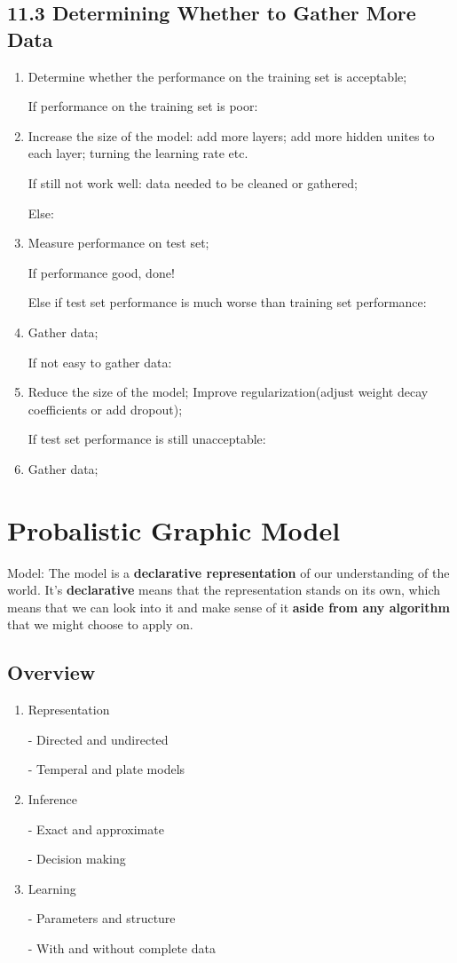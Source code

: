 \documentclass[12pt]{article}
\numberwithin{equation}{section}
\begin{document}
\subsection{11.3 Determining Whether to Gather More Data}
\begin{enumerate}
	\item Determine whether the performance on the training set is acceptable; 
	
	If performance on the training set is poor:
	\item Increase the size of the model: add more layers; add more hidden unites to each layer; turning 
	the learning rate etc.
	
	If still not work well: data needed to be cleaned or gathered;
	
	Else:
	\item Measure performance on test set;
	
	If performance good, done!
	
	Else if test set performance is much worse than training set performance:
	\item Gather data;
	
	If not easy to gather data:
	\item Reduce the size of the model; Improve regularization(adjust weight decay coefficients or add dropout);
	
	If test set performance is still unacceptable:
	\item Gather data;
\end{enumerate}



\section{Probalistic Graphic Model\cite{koller2009probabilistic}}

Model: The model is a \textbf{declarative representation} of our understanding of the world. It's \textbf{declarative} means that the representation stands on its own, which means that we can look into it and make sense of it \textbf{aside from any algorithm} that we might choose to apply on. 



\subsection{Overview}
\begin{enumerate}
	\item Representation
	
	- Directed and undirected
	
	- Temperal and plate models
	\item Inference
	
	- Exact and approximate
	
	- Decision making
	\item Learning
	
	- Parameters and structure
	
	- With and without complete data
\end{enumerate}





\renewcommand\refname{Reference}



  \clearpage
\end{document}
